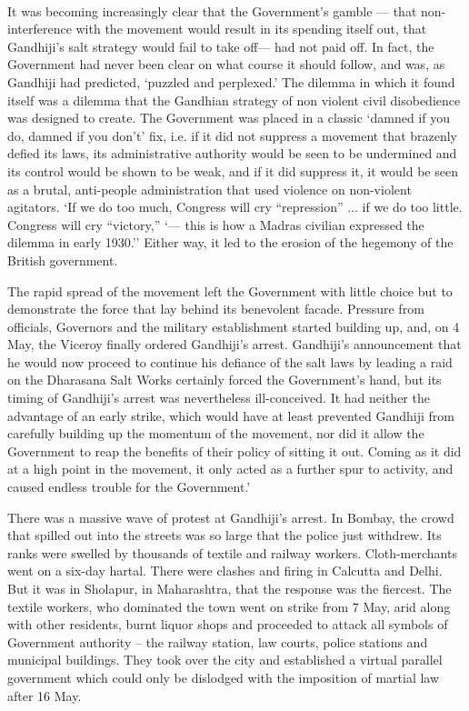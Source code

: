 \paragraph*{}
It was becoming increasingly clear that the Government's gamble — that non-interference with the movement would result in its spending itself out, that Gandhiji's salt strategy would fail to take off— had not paid off. In fact, the Government had never been clear on what course it should follow, and was, as Gandhiji had predicted, `puzzled and perplexed.' The dilemma in which it found itself was a dilemma that the Gandhian strategy of non­ violent civil disobedience was designed to create. The Government was placed in a classic `damned if you do, damned if you don't' fix, i.e. if it did not suppress a movement that brazenly defied its laws, its administrative authority would be seen to be undermined and its control would be shown to be weak, and if it did suppress it, it would be seen as a brutal, anti-people administration that used violence on non-violent agitators. `If we do too much, Congress will cry ``repression'' ... if we do too little. Congress will cry ``victory,'' `— this is how a Madras civilian expressed the dilemma in early 1930.'' Either way, it led to the erosion of the hegemony of the British government. 

The rapid spread of the movement left the Government with little choice but to demonstrate the force that lay behind its benevolent facade. Pressure from officials, Governors and the military establishment started building up, and, on 4 May, the Viceroy finally ordered Gandhiji's arrest. Gandhiji's announcement that he would now proceed to continue his defiance of the salt laws by leading a raid on the Dharasana Salt Works certainly forced the Government's hand, but its timing of Gandhiji's arrest was nevertheless ill-conceived. It had neither the advantage of an early strike, which would have at least prevented Gandhiji from carefully building up the momentum of the movement, nor did it allow the Government to reap the benefits of their policy of sitting it out. Coming as it did at a high point in the movement, it only acted as a further spur to activity, and caused endless trouble for the Government.' 

There was a massive wave of protest at Gandhiji's arrest. In Bombay, the crowd that spilled out into the streets was so large that the police just withdrew. Its ranks were swelled by thousands of textile and railway workers. Cloth-merchants went on a six-day hartal. There were clashes and firing in Calcutta and Delhi. But it was in Sholapur, in Maharashtra, that the response was the fiercest. The textile workers, who dominated the town went on strike from 7 May, arid along with other residents, burnt liquor shops and proceeded to attack all symbols of Government authority -- the railway station, law courts, police stations and municipal buildings. They took over the city and established a virtual parallel government which could only be dislodged with the imposition of martial law after 16 May.

